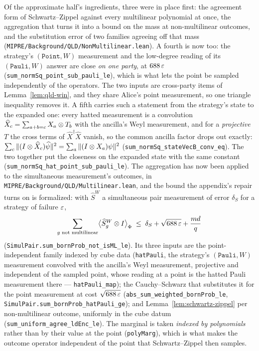 Of the approximate half's ingredients, three were in place first:
the agreement form of Schwartz--Zippel against every multilinear polynomial at once, the
aggregation that turns it into a bound on the mass at non-multilinear outcomes, and the
substitution error of two families agreeing off that mass
(\texttt{MIPRE/Background/QLD/NonMultilinear.lean}). A fourth is now too: the strategy's
$(\mathtt{Point}, W)$ measurement and the low-degree reading of its $(\mathtt{Pauli}, W)$ answer
are close \emph{on one party}, at $688\,\varepsilon$
(\texttt{sum\_normSq\_point\_sub\_pauli\_le}), which is what lets the point be sampled
independently of the operators. The two inputs are cross-party items of
Lemma~\ref{lem:qld-win}, and they share Alice's point measurement, so one triangle inequality
removes it. A fifth carries such a statement from the strategy's state to the expanded one: every
hatted measurement is a convolution $\widehat X_c = \sum_{a + b = c} X_a \otimes T_b$ with the
ancilla's Weyl measurement, and for a \emph{projective} $T$ the cross terms of
$\widehat X^\dagger \widehat X$ vanish, so the common ancilla factor drops out exactly:
$\sum_c \|(I \otimes \widehat X_c) \widehat\psi\|^2
  = \sum_a \|(I \otimes X_a) \psi\|^2$ (\texttt{sum\_normSq\_stateVecB\_conv\_eq}). The two
together put the closeness on the expanded state with the same constant
(\texttt{sum\_normSq\_hat\_point\_sub\_pauli\_le}). The aggregation has now been applied to the
simultaneous measurement's outcomes, in \texttt{MIPRE/Background/QLD/Multilinear.lean}, and the
bound the appendix's repair turns on is formalized: with $\widehat S^W$ a simultaneous pair
measurement of error $\delta_S$ for a strategy of failure $\varepsilon$,
\begin{equation*}
  \sum_{g \text{ not multilinear}} \bigl\langle \widehat S^W_g \otimes I \bigr\rangle_\Phi
  \;\leq\; \delta_S + \sqrt{688\,\varepsilon} + \frac{md}{q}
\end{equation*}
(\texttt{SimulPair.sum\_bornProb\_not\_isML\_le}). Its three inputs are the
point-independent family indexed by cube data (\texttt{hatPauli}, the strategy's
$(\mathtt{Pauli}, W)$ measurement convolved with the ancilla's Weyl measurement, projective and
independent of the sampled point, whose reading at a point is the hatted Pauli measurement there
--- \texttt{hatPauli\_map}); the Cauchy--Schwarz that substitutes it for the point measurement at
cost $\sqrt{688\,\varepsilon}$ (\texttt{abs\_sum\_weighted\_bornProb\_le},
\texttt{SimulPair.sum\_bornProb\_hatPauli\_ge}); and Lemma~\ref{lem:schwartz-zippel} per
non-multilinear outcome, uniformly in the cube datum
(\texttt{sum\_uniform\_agree\_ldEnc\_le}). The marginal is taken \emph{indexed by polynomials}
rather than by their value at the point (\texttt{polyMarg}), which is what makes the outcome
operator independent of the point that Schwartz--Zippel then samples.


